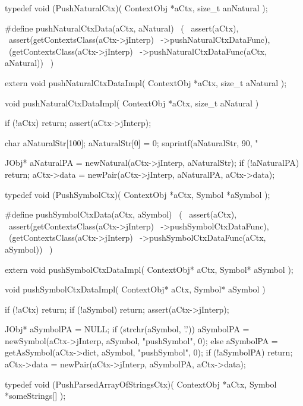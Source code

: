 \startCHeader
typedef void (PushNaturalCtx)(
  ContextObj *aCtx,
  size_t      anNatural
);

#define pushNaturalCtxData(aCtx, aNatural)      \
  (                                             \
    assert(aCtx),                               \
    assert(getContextsClass(aCtx->jInterp)      \
      ->pushNaturalCtxDataFunc),                \
    (getContextsClass(aCtx->jInterp)            \
      ->pushNaturalCtxDataFunc(aCtx, aNatural)) \
  )
\stopCHeader

\setCHeaderStream{private}
\startCHeader
extern void pushNaturalCtxDataImpl(
  ContextObj *aCtx,
  size_t      aNatural
);
\stopCHeader
\setCHeaderStream{public}

\startCCode
void pushNaturalCtxDataImpl(
  ContextObj *aCtx,
  size_t      aNatural
) {
  if (!aCtx) return;
  assert(aCtx->jInterp);

  char aNaturalStr[100];
  aNaturalStr[0] = 0;
  snprintf(aNaturalStr, 90, "%

  JObj* aNaturalPA = newNatural(aCtx->jInterp, aNaturalStr);
  if (!aNaturalPA) return;
  aCtx->data = newPair(aCtx->jInterp, aNaturalPA, aCtx->data);
}
\stopCCode

\startCHeader
typedef void (PushSymbolCtx)(
  ContextObj *aCtx,
  Symbol     *aSymbol
);

#define pushSymbolCtxData(aCtx, aSymbol)      \
  (                                           \
    assert(aCtx),                             \
    assert(getContextsClass(aCtx->jInterp)    \
      ->pushSymbolCtxDataFunc),               \
    (getContextsClass(aCtx->jInterp)          \
      ->pushSymbolCtxDataFunc(aCtx, aSymbol)) \
  )
\stopCHeader

\startCHeader
extern void pushSymbolCtxDataImpl(
  ContextObj* aCtx,
  Symbol* aSymbol
);
\stopCHeader
\setCHeaderStream{public}

\startCCode
void pushSymbolCtxDataImpl(
  ContextObj* aCtx,
  Symbol* aSymbol
) {
  if (!aCtx) return;
  if (!aSymbol) return;
  assert(aCtx->jInterp);

  JObj* aSymbolPA = NULL;
  if (strchr(aSymbol, '.')) {
    aSymbolPA =
      newSymbol(aCtx->jInterp, aSymbol, "pushSymbol", 0);
  } else {
    aSymbolPA = getAsSymbol(aCtx->dict, aSymbol, "pushSymbol", 0);
  }
  if (!aSymbolPA) return;
  aCtx->data = newPair(aCtx->jInterp, aSymbolPA, aCtx->data);
}
\stopCCode

\startCHeader
typedef void (PushParsedArrayOfStringsCtx)(
  ContextObj *aCtx,
  Symbol     *someStrings[]
);

